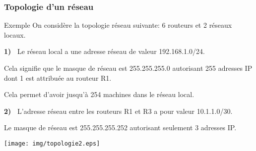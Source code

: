 \documentclass[8pt]{beamer}
\begin{document}
\begin{frame}
\frametitle{Topologie d'un réseau}
\begin{exampleblock}{Exemple}
On considère la topologie réseau suivante: 6 routeurs et 2 réseaux locaux.\medskip

\begin{minipage}{3.8cm}
\textbf{1)~} Le réseau local a une adresse réseau de valeur 192.168.1.0/24.\smallskip

Cela signifie que le masque de réseau est 255.255.255.0 autorisant 255 adresses IP dont 1 est attribuée au routeur R1. \smallskip

Cela permet d'avoir jusqu'à 254 machines dans le réseau local.\bigskip

\textbf{2)~} L'adresse réseau entre les routeurs R1 et R3 a pour valeur 10.1.1.0/30.\smallskip

Le masque de réseau est 255.255.255.252 autorisant seulement 3 adresses IP. \smallskip
\end{minipage}\hfill
\begin{minipage}{8.2cm}
\texttt{[image: img/topologie2.eps]}
\end{minipage}
\end{exampleblock}
\end{frame}
\end{document}
